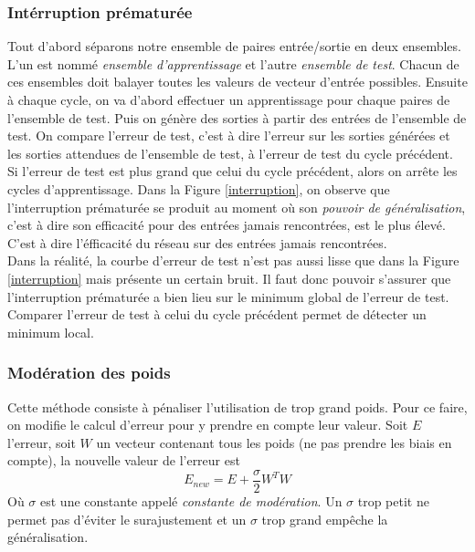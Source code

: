 \subsubsection*{Intérruption prématurée}
Tout d'abord séparons notre ensemble de paires entrée/sortie en deux ensembles.
L'un est nommé \emph{ensemble d'apprentissage} et l'autre \emph{ensemble de test}.
Chacun de ces ensembles doit balayer toutes les valeurs de vecteur d'entrée possibles.
Ensuite à chaque cycle, on va d'abord effectuer un apprentissage pour chaque paires de l'ensemble de test.
Puis on génère des sorties à partir des entrées de l'ensemble de test.
On compare l'erreur de test, c'est à dire l'erreur sur les sorties générées et les sorties attendues de l'ensemble de test, à l'erreur de test du cycle précédent.
Si l'erreur de test est plus grand que celui du cycle précédent, alors on arrête les cycles d'apprentissage.
Dans la Figure \ref{interruption}, on observe que l'interruption prématurée se produit au moment où son \emph{pouvoir de généralisation}, c'est à dire son efficacité pour des entrées jamais rencontrées, est le plus élevé.
C'est à dire l'éfficacité du réseau sur des entrées jamais rencontrées.\\

Dans la réalité, la courbe d'erreur de test n'est pas aussi lisse que dans la Figure \ref{interruption} mais présente un certain bruit.
Il faut donc pouvoir s'assurer que l'interruption prématurée a bien lieu sur le minimum global de l'erreur de test.
Comparer l'erreur de test à celui du cycle précédent permet de détecter un minimum local.
\subsubsection*{Modération des poids}
Cette méthode consiste à pénaliser l'utilisation de trop grand poids.
Pour ce faire, on modifie le calcul d'erreur pour y prendre en compte leur valeur.\cite{statistica}
Soit $E$ l'erreur, soit $W$ un vecteur contenant tous les poids (ne pas prendre les biais en compte), la nouvelle valeur de l'erreur est \[E_{new} = E + \frac{\sigma}{2}W^{T}W\]
Où $\sigma$ est une constante appelé \emph{constante de modération}.
Un $\sigma$ trop petit ne permet pas d'éviter le surajustement et un $\sigma$ trop grand empêche la généralisation.
